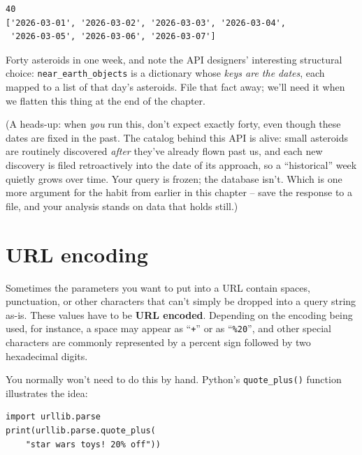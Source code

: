 \begin{Verbatim}[fontsize=\small,samepage=true,frame=leftline,framesep=5mm,framerule=1mm]
40
['2026-03-01', '2026-03-02', '2026-03-03', '2026-03-04',
 '2026-03-05', '2026-03-06', '2026-03-07']
\end{Verbatim}

Forty asteroids in one week, and note the API designers' interesting
structural choice: \texttt{near\_earth\_objects} is a dictionary whose
\textit{keys are the dates}, each mapped to a list of that day's asteroids.
File that fact away; we'll need it when we flatten this thing at the end of
the chapter.

(A heads-up: when \textit{you} run this, don't expect exactly forty, even
though these dates are fixed in the past. The catalog behind this API is
alive: small asteroids are routinely discovered \textit{after} they've
already flown past us, and each new discovery is filed retroactively into
the date of its approach, so a ``historical'' week quietly grows over time.
Your query is frozen; the database isn't. Which is one more argument for
the habit from earlier in this chapter -- save the response to a file, and
your analysis stands on data that holds still.)

\section{URL encoding}

Sometimes the parameters you want to put into a URL contain spaces,
punctuation, or other characters that can't simply be dropped into a query
string as-is. These values have to be \textbf{URL encoded}. Depending on the
encoding being used, for instance, a space may appear as ``\texttt{+}'' or as
``\texttt{\%20}'', and other special characters are commonly represented by
a percent sign followed by two hexadecimal digits.


You normally won't need to do this by hand. Python's
\texttt{quote\_plus()} function illustrates the idea:

\begin{Verbatim}[fontsize=\footnotesize,samepage=true,frame=single,framesep=3mm]
import urllib.parse
print(urllib.parse.quote_plus(
    "star wars toys! 20% off"))
\end{Verbatim}
\vspace{-.2in}

